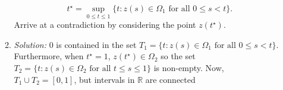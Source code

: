 \documentclass{article}
\newcommand{\R}{\mathbb{R}}
\begin{document}
\begin{enumerate}
\begin{enumerate}
        \[t^\star = \sup_{0\le t\le 1}\{t:z(s)\in\Omega_1\,\,\text{for all $0\le s < t$}\}.\]
        Arrive at a contradiction by considering the point $z(t^\star)$.
        \item[] \textit{Solution:} 0 is contained in the set $T_1 = \{t : z(s)\in \Omega_1\,\, \text{for all $0\le s < t$}\}$. Furthermore, when $t^\star = 1$, $z(t^\star)\in \Omega_2$ so the set $T_2 = \{t : z(s)\in \Omega_2 \,\,\text{for all $t \le s \le 1$}\}$ is non-empty. Now, $T_1\cup T_2 = [0,1]$, but intervals in $\R$ are connected
      \end{enumerate}
    \end{enumerate}
\end{document}
